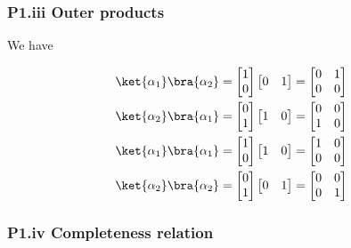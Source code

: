 \subsubsection{P1.iii Outer products}

We have

\begin{align*}
\ket{\alpha_1}\bra{\alpha_2} &=
\begin{bmatrix}
1 \\
0
\end{bmatrix} 
\begin{bmatrix}
0 & 1
\end{bmatrix} 
=
\begin{bmatrix}
0 & 1 \\
0 & 0
\end{bmatrix} \\
\ket{\alpha_2}\bra{\alpha_1} &=
\begin{bmatrix}
0 \\
1
\end{bmatrix} 
\begin{bmatrix}
1 & 0
\end{bmatrix} 
=
\begin{bmatrix}
0 & 0 \\
1 & 0
\end{bmatrix} \\
\ket{\alpha_1}\bra{\alpha_1} &=
\begin{bmatrix}
1 \\
0
\end{bmatrix} 
\begin{bmatrix}
1 & 0
\end{bmatrix} 
=
\begin{bmatrix}
1 & 0 \\
0 & 0
\end{bmatrix} \\
\ket{\alpha_2}\bra{\alpha_2} &=
\begin{bmatrix}
0 \\
1
\end{bmatrix} 
\begin{bmatrix}
0 & 1
\end{bmatrix} 
=
\begin{bmatrix}
0 & 0 \\
0 & 1
\end{bmatrix} \\
\end{align*}

\subsubsection{P1.iv Completeness relation}

